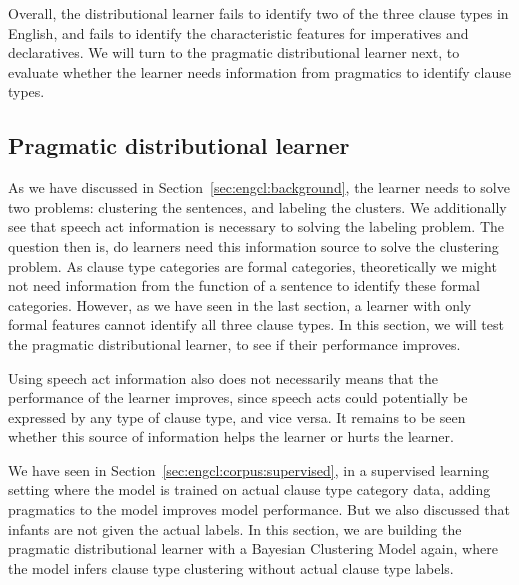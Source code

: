Overall, the distributional learner fails to identify two of the three clause types in English, and fails to identify the characteristic features for imperatives and declaratives. We will turn to the pragmatic distributional learner next, to evaluate whether the learner needs information from pragmatics to identify clause types.



\subsection{Pragmatic distributional learner}
\label{sec:engcl:model:pragmatics}

As we have discussed in Section~\ref{sec:engcl:background}, the learner needs to solve two problems: clustering the sentences, and labeling the clusters. We additionally see that speech act information is necessary to solving the labeling problem. The question then is, do learners need this information source to solve the clustering problem. As clause type categories are formal categories, theoretically we might not need information from the function of a sentence to identify these formal categories. However, as we have seen in the last section, a learner with only formal features cannot identify all three clause types. In this section, we will test the pragmatic distributional learner, to see if their performance improves.

Using speech act information also does not necessarily means that the performance of the learner improves, since speech acts could potentially be expressed by any type of clause type, and vice versa. It remains to be seen whether this source of information helps the learner or hurts the learner. 

We have seen in Section~\ref{sec:engcl:corpus:supervised}, in a supervised learning setting where the model is trained on actual clause type category data, adding pragmatics to the model improves model performance. But we also discussed that infants are not given the actual labels. In this section, we are building the pragmatic distributional learner with a Bayesian Clustering Model again, where the model infers clause type clustering without actual clause type labels. 

